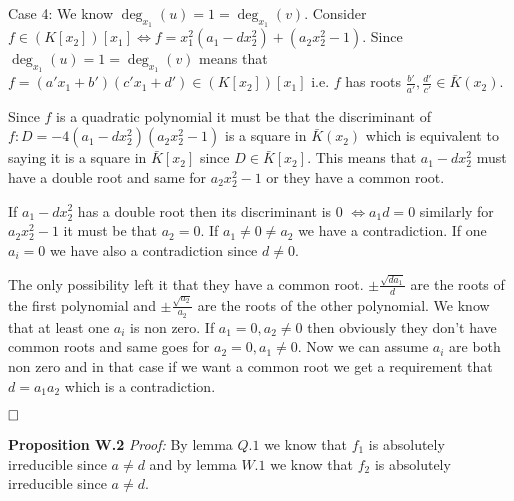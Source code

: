 \documentclass[12pt, a4paper]{article}
\newcommand{\qed}{\hfill\square}
\begin{document}
Case 4: We know $\deg_{x_1}(u)=1=\deg_{x_1}(v)$. Consider $f \in (K[x_2])[x_1] \iff f = x_1^2(a_1-dx_2^2)+(a_2x_2^2-1)$. Since $\deg_{x_1}(u)=1=\deg_{x_1}(v)$ means that $f = (a'x_1+b')(c'x_1+d') \in (K[x_2])[x_1]$ i.e. $f$ has roots $\frac{b'}{a'}, \frac{d'}{c'} \in \bar{K}(x_2)$. 

Since $f$ is a quadratic polynomial it must be that the discriminant of $f: D= -4(a_1-dx_2^2)(a_2x_2^2-1)$ is a square in $\bar{K}(x_2)$ which is equivalent to saying it is a square in $\bar{K}[x_2]$ since $D \in \bar{K}[x_2]$. This means that $a_1-dx_2^2$ must have a double root and same for $a_2x_2^2-1$ or they have a common root. 

If $a_1-dx_2^2$ has a double root then its discriminant is 0 $\iff a_1d = 0$ similarly for $a_2x_2^2-1$ it must be that $a_2 = 0$. If $a_1 \neq 0 \neq a_2$ we have a contradiction. If one $a_i=0$ we have also a contradiction since $d \neq 0$. 

The only possibility left it that they have a common root. $\pm\frac{\sqrt{da_1}}{d}$ are the roots of the first polynomial and $\pm\frac{\sqrt{a_2}}{a_2}$ are the roots of the other polynomial. We know that at least one $a_i$ is non zero. If $a_1 = 0, a_2 \neq 0$ then obviously they don't have common roots and same goes for $a_2 = 0, a_1 \neq 0$. Now we can assume $a_i$ are both non zero and in that case if we want a common root we get a requirement that $d=a_1a_2$ which is a contradiction.

$\qed$


\textbf{Proposition W.2} \textit{Proof:}
By lemma $Q.1$ we know that $f_1$ is absolutely irreducible since $a\neq d$ and by lemma $W.1$ we know that $f_2$ is absolutely irreducible since $a \neq d$. 
\end{document}
